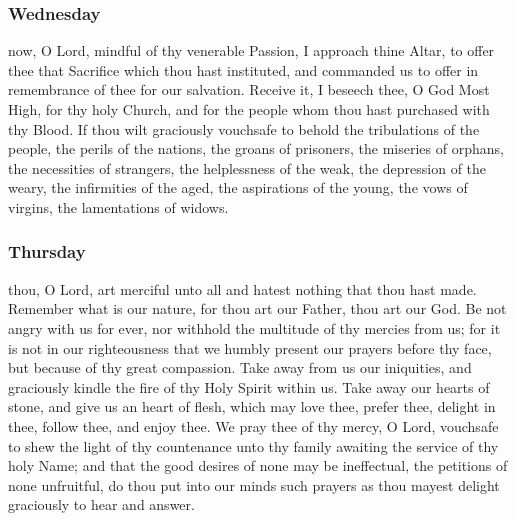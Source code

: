 \subsubsection{Wednesday}
 now, O Lord, mindful of thy venerable Passion, I approach thine Altar, to offer thee that Sacrifice which thou hast instituted, and commanded us to offer in remembrance of thee for our salvation. Receive it, I beseech thee, O God Most High, for thy holy Church, and for the people whom thou hast purchased with thy Blood. 
If thou wilt graciously vouchsafe to behold the tribulations of the people, the perils of the nations, the groans of prisoners, the miseries of orphans, the necessities of strangers, the helplessness of the weak, the depression of the weary, the infirmities of the aged, the aspirations of the young, the vows of virgins, the lamentations of widows.

\subsubsection{Thursday}
 thou, O Lord, art merciful unto all and hatest nothing that thou hast made. Remember what is our nature, for thou art our Father, thou art our God. Be not angry with us for ever, nor withhold the multitude of thy mercies from us; for it is not in our righteousness that we humbly present our prayers before thy face, but because of thy great compassion. Take away from us our iniquities, and graciously kindle the fire of thy Holy Spirit within us. Take away our hearts of stone, and give us an heart of flesh, which may love thee, prefer thee, delight in thee, follow thee, and enjoy thee. We pray thee of thy mercy, O Lord, vouchsafe to shew the light of thy countenance unto thy family awaiting the service of thy holy Name; and that the good desires of none may be ineffectual, the petitions of none unfruitful, do thou put into our minds such prayers as thou mayest delight graciously to hear and answer. 
